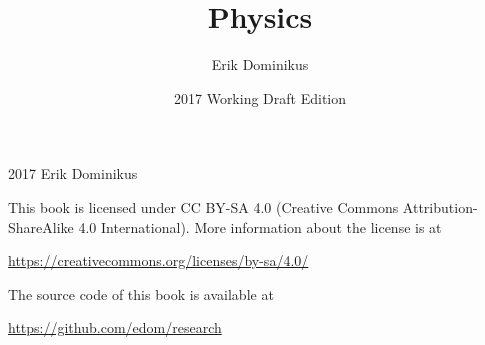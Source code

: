 \documentclass[12pt,twoside,openany,draft]{memoir}
\title{Physics}
\author{Erik Dominikus}
\date{2017 Working Draft Edition}%
\begin{document}
\def\MathSkip{0.25em}
\setlength\abovedisplayskip{\MathSkip}
\setlength\belowdisplayskip{\MathSkip}
\setlength\abovedisplayshortskip{\MathSkip}
\setlength\belowdisplayshortskip{\MathSkip}
%
%
\setlength\beforechapskip{1em}
\setlength\afterchapskip{1em}
\renewcommand\chapterheadstart{\par\vspace{\beforechapskip}}
\renewcommand\clearforchapter{}%
\indentafterchapter
\setlength\jot{0em}%
\frontmatter
\begin{titlingpage}
    {
        \centering
        \def\usefontsize#1{\fontsize{#1}{#1}\selectfont}
        {\noindent\usefontsize{6em}\bfseries\thetitle\par}
        \vspace*{2em}
        {\noindent\usefontsize{1.5em}\bfseries\thedate\par}
        \vspace*{\fill}
        {\noindent\usefontsize{1.25em}\bfseries\theauthor\par}
    }
    \pagebreak
{
    \setlength\parindent{0em}

    \textcopyright{} 2017 Erik Dominikus

    \vspace{1em}

    This book is licensed under CC BY-SA 4.0 (Creative Commons Attribution-ShareAlike 4.0 International).
    More information about the license is at

    \url{https://creativecommons.org/licenses/by-sa/4.0/}

    \vspace{1em}

    The source code of this book is available at

    \url{https://github.com/edom/research}
}
\end{titlingpage}

\pagebreak

\long{}

\pagebreak



{
    \makeatletter
    {
        \pagebreak
        \renewcommand\contentsname{List of parts}
        \tableofcontents
    }
    {
        \pagebreak
        \renewcommand\contentsname{List of chapters}
        \tableofcontents
    }
    {
        \pagebreak
        \renewcommand\contentsname{Table of contents}
        \tableofcontents
    }
    \listoftables
    \listoffigures
    \makeatother
}
\end{document}
